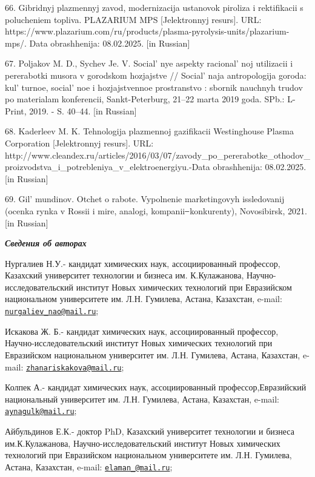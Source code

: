 66. Gibridnyj plazmennyj zavod, modernizacija ustanovok piroliza i
rektifikacii s polucheniem topliva. PLAZARIUM MPS {[}Jelektronnyj
resurs{]}. URL:
https://www.plazarium.com/ru/products/plasma-pyrolysis-units/plazarium-mps/.
Data obrashhenija: 08.02.2025. {[}in Russian{]}

67. Poljakov M. D., Sychev Je. V. Social' nye aspekty
racional' noj utilizacii i pererabotki musora v gorodskom
hozjajstve // Social' naja antropologija goroda:
kul' turnoe, social' noe i hozjajstvennoe
prostranstvo : sbornik nauchnyh trudov po materialam konferencii,
Sankt-Peterburg, 21--22 marta 2019 goda. SPb.: L-Print, 2019. - S.
40--44. {[}in Russian{]}

68. Kaderleev M. K. Tehnologija plazmennoj gazifikacii Westinghouse
Plasma Corporation {[}Jelektronnyj resurs{]}. URL:
http://www.cleandex.ru/articles/2016/03/07/zavody\_po\_pererabotke\_othodov\_proizvodstva\_i\_potrebleniya\_v\_elektroenergiyu.-Data
obrashhenija: 08.02.2025. {[}in Russian{]}

69. Gil' mundinov. Otchet o rabote. Vypolnenie
marketingovyh issledovanij (ocenka rynka v Rossii i mire, analogi,
kompanii ̶ konkurenty), Novosibirsk, 2021. {[}in Russian{]}

\emph{{\bfseries Сведения об авторах}}

Нургалиев Н.У.- кандидат химических наук, ассоциированный профессор,
Казахский университет технологии и бизнеса им. К.Кулажанова,
Научно-исследовательский институт Новых химических технологий при
Евразийском национальном университете им. Л.Н. Гумилева, Астана,
Казахстан, e-mail:
\href{mailto:nurgaliev_nao@mail.ru}{\nolinkurl{nurgaliev\_nao@mail.ru}};

Искакова Ж. Б.- кандидат химических наук, ассоциированный профессор,
Научно-исследовательский институт Новых химических технологий при
Евразийском национальном университет им. Л.Н. Гумилева, Астана,
Казахстан, e-mail:
\href{mailto:zhanariskakova@mail.ru}{\nolinkurl{zhanariskakova@mail.ru}};

Колпек А.- кандидат химических наук, ассоциированный
профессор,Евразийский национальный университет им. Л.Н. Гумилева,
Астана, Казахстан, e-mail:
\href{mailto:aynagulk@mail.ru}{\nolinkurl{aynagulk@mail.ru}};

Айбульдинов Е.К.- доктор PhD, Казахский университет технологии и бизнеса
им.К.Кулажанова, Научно-исследовательский институт Новых химических
технологий при Евразийском национальном университете им. Л.Н. Гумилева,
Астана, Казахстан, e-mail:
\href{mailto:elaman_@mail.ru}{\nolinkurl{elaman\_@mail.ru}};

